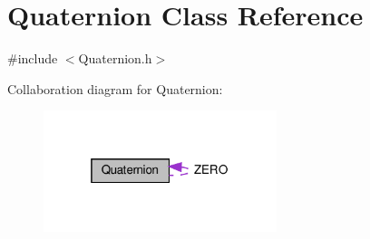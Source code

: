 \hypertarget{classQuaternion}{}\section{Quaternion Class Reference}
\label{classQuaternion}


{\ttfamily \#include $<$Quaternion.\+h$>$}



Collaboration diagram for Quaternion\+:
\nopagebreak
\begin{figure}[H]
\begin{center}
\leavevmode
\includegraphics[width=193pt]{classQuaternion__coll__graph}
\end{center}
\end{figure}
